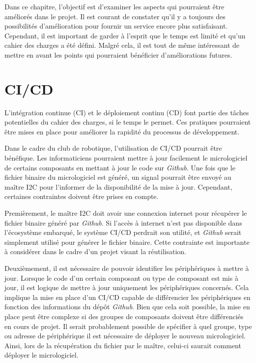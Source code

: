 Dans ce chapitre, l'objectif est d'examiner les aspects qui pourraient être améliorés dans le projet.
Il est courant de constater qu'il y a toujours des possibilités d'amélioration pour fournir un service encore plus satisfaisant.
Cependant, il est important de garder à l'esprit que le temps est limité et qu'un cahier des charges a été défini.
Malgré cela, il est tout de même intéressant de mettre en avant les points qui pourraient bénéficier d'améliorations futures.

\section{CI/CD}

L'intégration continue (CI) et le déploiement continu (CD) font partie des tâches potentielles du cahier des charges, si le temps le permet.
Ces pratiques pourraient être mises en place pour améliorer la rapidité du processus de développement.

Dans le cadre du club de robotique, l'utilisation de CI/CD pourrait être bénéfique.
Les informaticiens pourraient mettre à jour facilement le micrologiciel de certains composants en mettant à jour le code sur \textit{Github}.
Une fois que le fichier binaire du micrologiciel est généré, un signal pourrait être envoyé au maître I2C pour l'informer de la disponibilité de la mise à jour.
Cependant, certaines contraintes doivent être prises en compte.

Premièrement, le maître I2C doit avoir une connexion internet pour récupérer le fichier binaire généré par \textit{Github}.
Si l'accès à internet n'est pas disponible dans l'écosystème embarqué, le système CI/CD perdrait son utilité, et \textit{Github} serait simplement utilisé pour générer le fichier binaire.
Cette contrainte est importante à considérer dans le cadre d'un projet visant la réutilisation.

Deuxièmement, il est nécessaire de pouvoir identifier les périphériques à mettre à jour.
Lorsque le code d'un certain composant ou type de composant est mis à jour, il est logique de mettre à jour uniquement les périphériques concernés.
Cela implique la mise en place d'un CI/CD capable de différencier les périphériques en fonction des informations du dépôt \textit{Github}.
Bien que cela soit possible, la mise en place peut être complexe si des groupes de composants doivent être différenciés en cours de projet. Il serait probablement possible de spécifier à quel groupe, type ou adresse de périphérique il est nécessaire de déployer le nouveau micrologiciel.
Ainsi, lors de la récupération du fichier par le maître, celui-ci saurait comment déployer le micrologiciel.

